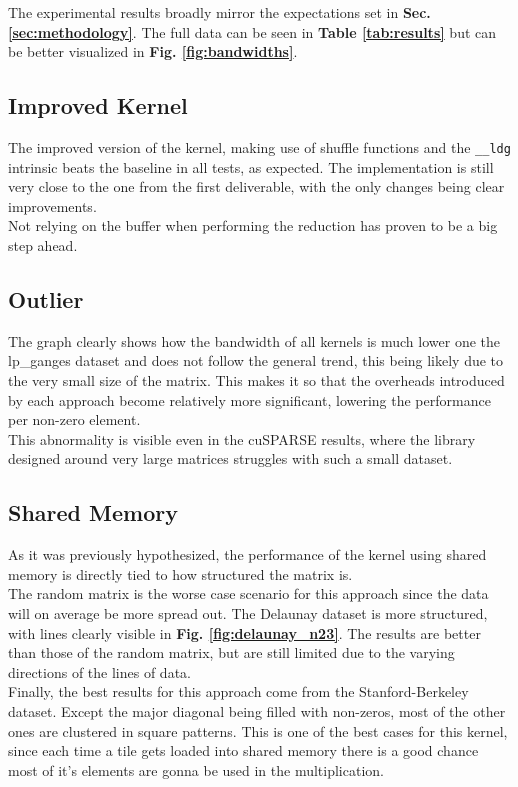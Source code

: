 \documentclass[conference]{IEEEtran}
\begin{document}
The experimental results broadly mirror the expectations set in \textbf{Sec. \ref{sec:methodology}}. The full data can be seen in \textbf{Table \ref{tab:results}} but can be better visualized in \textbf{Fig. \ref{fig:bandwidths}}.

\subsection{Improved Kernel}
The improved version of the kernel, making use of shuffle functions and the \texttt{\_\_ldg} intrinsic beats the baseline in all tests, as expected. The implementation is still very close to the one from the first deliverable, with the only changes being clear improvements.\\
Not relying on the buffer when performing the reduction has proven to be a big step ahead.

\subsection{Outlier}
The graph clearly shows how the bandwidth of all kernels is much lower one the lp\_ganges dataset and does not follow the general trend, this being likely due to the very small size of the matrix. This makes it so that the overheads introduced by each approach become relatively more significant, lowering the performance per non-zero element.\\
This abnormality is visible even in the cuSPARSE results, where the library designed around very large matrices struggles with such a small dataset.

\subsection{Shared Memory}
As it was previously hypothesized, the performance of the kernel using shared memory is directly tied to how structured the matrix is.\\
The random matrix is the worse case scenario for this approach since the data will on average be more spread out. The Delaunay dataset is more structured, with lines clearly visible in \textbf{Fig. \ref{fig:delaunay_n23}}. The results are better than those of the random matrix, but are still limited due to the varying directions of the lines of data.\\
Finally, the best results for this approach come from the Stanford-Berkeley dataset. Except the major diagonal being filled with non-zeros, most of the other ones are clustered in square patterns. This is one of the best cases for this kernel, since each time a tile gets loaded into shared memory there is a good chance most of it's elements are gonna be used in the multiplication.
\end{document}

